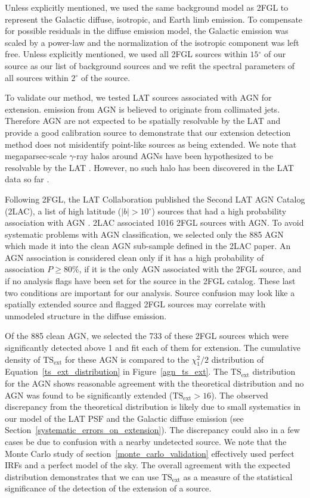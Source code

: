 \documentclass[12pt,preprint]{aastex}
\newcommand{\gev}{\text{GeV}\xspace}
\newcommand{\tsext}{{\ensuremath{\text{TS}_{\text{ext}}}}\xspace}
\newcommand{\degree}{\ensuremath{^\circ}\xspace}
\begin{document}
Unless explicitly
mentioned, we used the same background model as 2FGL to represent the
Galactic diffuse, isotropic, and Earth limb emission.  To compensate for
possible residuals in the diffuse emission model, the Galactic emission
was scaled by a power-law and the normalization
of the isotropic component
was left free.  
Unless explicitly mentioned,
we used all 2FGL sources within $15\degree$ of our source as our list
of background sources and we refit the spectral parameters of all sources
within $2\degree$ of the source.



To validate our method, we tested LAT sources associated with AGN for
extension.  \gev emission from AGN is believed to originate from collimated jets.  Therefore AGN are
not expected to be spatially resolvable by the LAT and provide a good
calibration source to demonstrate that our extension detection method
does not misidentify point-like sources as being extended.  We note that
megaparsec-scale $\gamma$-ray halos around AGNs have been hypothesized
to be resolvable by the LAT \citep{pair_halo_paper}. However, no such
halo has been discovered in the LAT data so far \citep{neronov_agn_halo}.

Following 2FGL, the LAT Collaboration published the Second LAT AGN
Catalog (2LAC), a list of high latitude ($|b|>10\degree$) sources
that had a high probability association with AGN \citep{second_agn_cat}.
2LAC associated 1016 2FGL sources with AGN.  To avoid systematic problems
with AGN classification, we selected only the 885 AGN which made it into
the clean AGN sub-sample defined in the 2LAC paper.  An AGN association is considered clean only
if it has a high probability of association $P\ge 80\%$, if it is the
only AGN associated with the 2FGL source, and if 
no analysis flags have been set for the source
in the 2FGL catalog. These last two conditions are important for our
analysis. Source confusion may look like a spatially extended source
and flagged 2FGL sources may correlate with unmodeled structure in
the diffuse emission.

Of the 885 clean AGN, we selected the 733 of these 2FGL sources which
were significantly detected above 1 \gev and fit each of them for
extension.  The cumulative density of \tsext for these AGN is compared
to the $\chi^2_1/2$ distribution of Equation~\ref{ts_ext_distribution}
in Figure~\ref{agn_ts_ext}.  The \tsext distribution
for the AGN shows reasonable agreement with the theoretical
distribution and no AGN was found to be significantly extended
($\tsext>16$).  The observed discrepancy from the theoretical
distribution is likely due to small systematics
in our model of the LAT PSF and the Galactic diffuse emission (see
Section~\ref{systematic_errors_on_extension}).  
The discrepancy could
also in a few cases be due to confusion with a nearby undetected source.
We note that the Monte Carlo study
of section~\ref{monte_carlo_validation} effectively used perfect
IRFs and a perfect model of the sky.
The overall agreement with the expected distribution demonstrates that
we can use \tsext as a measure of the statistical significance of the
detection of the extension of a source.
\end{document}
